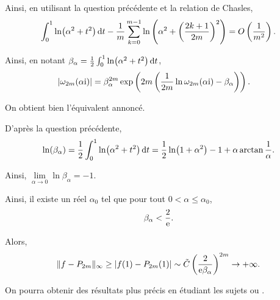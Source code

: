 \begin{solution}
\begin{reponses}
Ainsi, en utilisant la question précédente et la relation de Chasles,
\[
\int_0^1 \ln(\alpha^2 + t^2) \, \mathrm{d} t - \frac{1}{m} \sum_{k=0}^{m-1} \ln\left(\alpha^2 + \left(\frac{2 k + 1}{2 m}\right)^2\right) = O\left(\frac{1}{m^2}\right).
\]

Ainsi, en notant $\beta_\alpha = \frac{1}{2} \int_0^1 \ln(\alpha^2 + t^2) \, \mathrm{d} t$,
\begin{align*}
\mathopen{}\left| \omega_{2m}(\alpha \mathrm{i}) \right|
&= \beta_\alpha^{2m} \exp\left(2m \left(\frac{1}{2m} \ln\omega_{2m}(\alpha \mathrm{i}) - \beta_\alpha\right)\right).
\end{align*}

On obtient bien l'équivalent annoncé.


\item D'après la question précédente,
\[
\ln(\beta_\alpha)
= \frac{1}{2} \int_0^1 \ln(\alpha^2 + t^2) \, \mathrm{d} t
= \frac{1}{2} \ln(1 + \alpha^2) - 1 + \alpha \arctan \frac{1}{\alpha}.
\]

Ainsi, $\lim\limits_{\alpha \to 0} \ln \beta_\alpha = -1$.

\item Ainsi, il existe un réel $\alpha_0$ tel que pour tout $0 < \alpha \leq \alpha_0$,
\[
\beta_\alpha < \frac{2}{\mathrm{e}}.
\]

Alors,
\[
\Vert f - P_{2m} \Vert_\infty
\geq
\mathopen{}\left| f(1) - P_{2m}(1) \right|
\sim \tilde{C} \left(\frac{2}{\mathrm{e} \beta_\alpha}\right)^{2m} \to +\infty.
\]
\end{reponses}
\end{solution}

\begin{remarque}
On pourra obtenir des résultats plus précis en étudiant les sujets \cite{st_cyr-1-commune-1993} ou \cite{x_ens-psi-1998}.
\end{remarque}